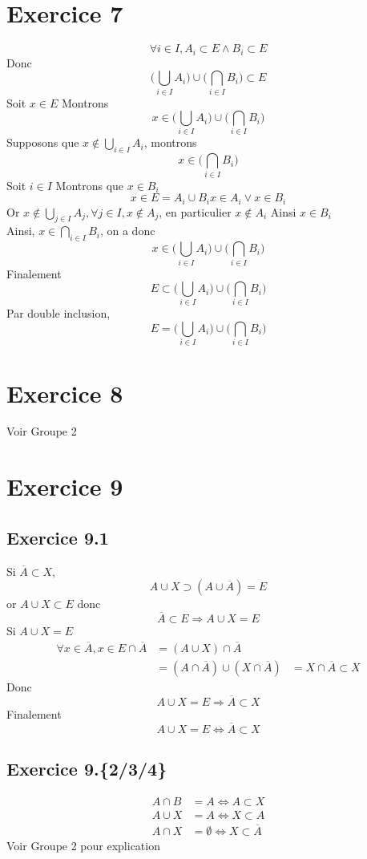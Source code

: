 \documentclass[a4paper,12pt]{article}
\begin{document}
\section{Exercice 7}
$$\forall i \in I, A_i \subset E \wedge B_i \subset E$$
Donc
$$\Big( \bigcup_ {i\in I} A_i \Big) \cup \Big( \bigcap_ {i\in I} B_i \Big) \subset E$$
Soit $x \in E$ Montrons 
$$ x \in \Big( \bigcup_ {i\in I} A_i \Big) \cup \Big( \bigcap_ {i\in I} B_i \Big)$$
Supposons que $ x \not \in  \bigcup_ {i\in I} A_i$, montrons 
$$x \in \Big( \bigcap_ {i\in I} B_i \Big)$$
Soit $i \in I$ Montrons que $x \in B_i$
\[
x \in E = A_i \cup B_i
x \in A_i \vee x \in B_i
\]
Or $ x \not \in  \bigcup_ {j\in I} A_j, \forall j \in I, x \not\in A_j$, en particulier $x \not\in A_i$ Ainsi $x \in B_i$\\
Ainsi, $x \in \bigcap_ {i\in I} B_i$, on a donc $$x \in \Big( \bigcup_ {i\in I} A_i \Big) \cup \Big( \bigcap_ {i\in I} B_i \Big)$$
Finalement
$$E \subset \Big( \bigcup_ {i\in I} A_i \Big) \cup \Big( \bigcap_ {i\in I} B_i \Big)$$
Par double inclusion, $$E = \Big( \bigcup_ {i\in I} A_i \Big) \cup \Big( \bigcap_ {i\in I} B_i \Big)$$

\section{Exercice 8}
Voir Groupe 2
\section{Exercice 9} 
\subsection{Exercice 9.1}
Si $ \overline{A} \subset X, $
$$A \cup X \supset (A \cup \overline{A}) = E$$
or $A \cup X \subset E$
donc 
$$\overline{A} \subset E \Rightarrow A \cup X = E$$
Si $A \cup X = E$
\[
\begin{aligned}
\forall x \in \overline{A}, x \in E \cap \overline{A} &= (A \cup X) \cap \overline{A}\\
&= (A \cap \overline{A}) \cup (X \cap \overline{A})
&= X \cap \overline{A} \subset X
\end{aligned}
\]
Donc $$A \cup X = E \Rightarrow \overline{A} \subset X$$
Finalement $$A\cup X = E \Leftrightarrow \overline{A} \subset X$$
\subsection{Exercice 9.\{2/3/4\}}
\[
\begin{aligned}
A \cap B &= A \Leftrightarrow A \subset X\\
A  \cup X &= A \Leftrightarrow X \subset A\\
A \cap X &= \emptyset \Leftrightarrow X \subset \overline{A}
\end{aligned}
\]
Voir Groupe 2 pour explication
\end{document}
